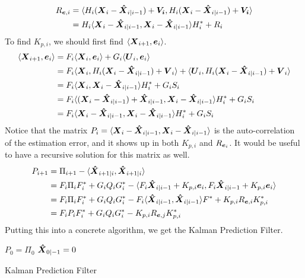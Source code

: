 \begin{align*}
	R_{\boldsymbol{e},i} &= \langle H_i(\boldsymbol{X}_i - \boldsymbol{\hat{X}}_{i|i-1})+ \boldsymbol{V_i}, H_i(\boldsymbol{X}_i - \boldsymbol{\hat{X}}_{i|i-1})+\boldsymbol{V_i} \rangle\\
	&= H_i\langle \boldsymbol{X}_i - \boldsymbol{\hat{X}}_{i|i-1}, \boldsymbol{X}_i - \boldsymbol{\hat{X}}_{i|i-1} \rangle H_i^* + R_i
\end{align*}
To find $K_{p,i}$, we should first find $\langle \boldsymbol{X}_{i+1}, \boldsymbol{e}_i \rangle$.
\begin{align*}
	\langle \boldsymbol{X}_{i+1}, \boldsymbol{e}_i \rangle &= F_i\langle \boldsymbol{X}_i, \boldsymbol{e}_i \rangle + G_i\langle \boldsymbol{U}_i, \boldsymbol{e}_i \rangle\\
	&= F_i\langle \boldsymbol{X}_i, H_i(\boldsymbol{X}_i - \boldsymbol{\hat{X}}_{i|i-1})+\boldsymbol{V}_i \rangle + \langle \boldsymbol{U}_i, H_i(\boldsymbol{X}_i - \boldsymbol{\hat{X}}_{i|i-1})+\boldsymbol{V}_i \rangle \\
	&= F_i\langle \boldsymbol{X}_i, \boldsymbol{X}_i - \boldsymbol{\hat{X}}_{i|i-1} \rangle H_i^* + G_iS_i\\
	&= F_i\langle (\boldsymbol{X}_i - \boldsymbol{\hat{X}}_{i|i-1}) + \boldsymbol{\hat{X}}_{i|i-1}, \boldsymbol{X}_i - \boldsymbol{\hat{X}}_{i|i-1} \rangle H_i^* + G_iS_i\\
	&= F_i\langle \boldsymbol{X}_i - \boldsymbol{\hat{X}}_{i|i-1}, \boldsymbol{X}_i - \boldsymbol{\hat{X}}_{i|i-1} \rangle H_i^* + G_iS_i
\end{align*}
Notice that the matrix $P_i = \langle \boldsymbol{X}_i - \boldsymbol{\hat{X}}_{i|i-1}, \boldsymbol{X}_i - \boldsymbol{\hat{X}}_{i|i-1} \rangle$ is the auto-correlation of the estimation error, and it shows up in both $K_{p,i}$ and $R_{\boldsymbol{e}_i}$.
It would be useful to have a recursive solution for this matrix as well.
\begin{align*}
	P_{i+1} &= \Pi_{i+1}-\langle \boldsymbol{\hat{X}}_{i+1|i}, \boldsymbol{\hat{X}}_{i+1|i} \rangle \\
	&= F_i\Pi_iF_i^* + G_iQ_iG_i^* - \langle F_i\boldsymbol{\hat{X}}_{i|i-1}+K_{p,i}\boldsymbol{e}_i, F_i\boldsymbol{\hat{X}}_{i|i-1}+K_{p,i}\boldsymbol{e}_i \rangle\\
	&= F_i\Pi_iF_i^* + G_iQ_iG_i^* - F_i\langle \boldsymbol{\hat{X}}_{i|i-1}, \boldsymbol{\hat{X}}_{i|i-1} \rangle F^*+K_{p,i}R_{\boldsymbol{e},i}K_{p,i}^*\\
	&= F_iP_iF_i^* + G_iQ_iG_i^* - K_{p,i}R_{\boldsymbol{e},j}K_{p,i}^*
\end{align*}
Putting this into a concrete algorithm, we get the Kalman Prediction Filter.

\begin{algorithm}[H]
	\SetAlgoLined
	$P_0 = \Pi_0$\;
	$\boldsymbol{\hat{X}}_{0|-1} = 0$\;
	\caption{Kalman Prediction Filter}
\end{algorithm}
